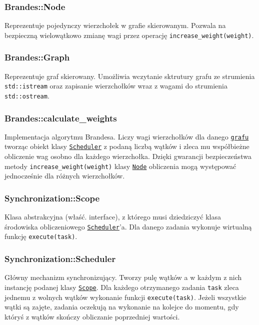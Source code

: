 \documentclass{article}
\begin{document}
      \subsubsection{Brandes::Node}
      \label{class:brandes__node}
      Reprezentuje pojedynczy wierzchołek w grafie skierowanym. Pozwala na
      bezpieczną wielowątkowo zmianę wagi przez operację
      \texttt{increase\_weight(weight)}.

      \subsubsection{Brandes::Graph}
      \label{class:brandes__graph}
      Reprezentuje graf skierowany. Umożliwia wczytanie sktrutury grafu ze strumienia
      \texttt{std::istream} oraz zapisanie wierzchołków wraz z wagami do strumienia
      \texttt{std::ostream}.

      \subsubsection{Brandes::calculate\_weights}
      \label{func:brandes__calculate_weights}
      Implementacja algorytmu Brandesa. Liczy wagi wierzchołków dla danego
      \hyperref[class:brandes__graph]{\texttt{grafu}} tworząc obiekt klasy
      \hyperref[class:synchronization__scheduler]{\texttt{Scheduler}} z podaną
      liczbą wątków i zleca mu współbieżne obliczenie wag osobno dla każdego
      wierzchołka. Dzięki gwarancji bezpieczeństwa metody
      \texttt{increase\_weight(weight)} klasy \hyperref[class:brandes__node]
      {\texttt{Node}} obliczenia mogą występować jednocześnie dla różnych
      wierzchołków.

      \subsubsection{Synchronization::Scope}
      \label{class:synchronization__scope}
      Klasa abstrakcyjna (właść. interface), z którego musi dziedziczyć klasa
      środowiska obliczeniowego \hyperref[class:synchronization__scheduler]
      {\texttt{Scheduler}}'a. Dla danego zadania wykonuje wirtualną funkcję
      \texttt{execute(task)}.

      \subsubsection{Synchronization::Scheduler}
      \label{class:synchronization__scheduler}
      Główny mechanizm synchronizujący. Tworzy pulę wątków a w każdym z nich
      instancję podanej klasy \hyperref[class:synchronization__scope]{\texttt{Scope}}.
      Dla każdego otrzymanego zadania \texttt{task} zleca jednemu z wolnych wątków
      wykonanie funkcji \texttt{execute(task)}. Jeżeli wszystkie wątki są zajęte,
      zadania oczekują na wykonanie na kolejce do momentu, gdy któryś
      z wątków skończy obliczanie poprzedniej wartości.
\end{document}
